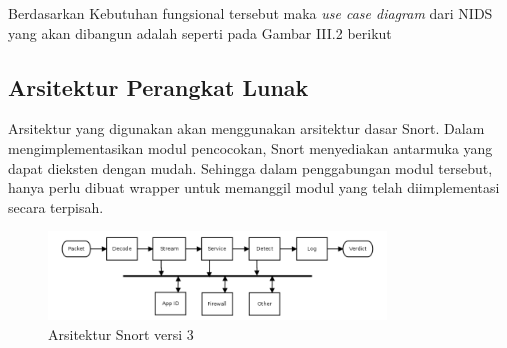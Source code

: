       Berdasarkan Kebutuhan fungsional tersebut maka \emph{use case diagram} dari NIDS yang akan dibangun adalah seperti pada Gambar III.2 berikut

    \subsection{Arsitektur Perangkat Lunak}

      Arsitektur yang digunakan akan menggunakan arsitektur dasar Snort. Dalam mengimplementasikan modul pencocokan, Snort menyediakan antarmuka yang dapat dieksten dengan mudah. Sehingga dalam penggabungan modul tersebut, hanya perlu dibuat wrapper untuk memanggil modul yang telah diimplementasi secara terpisah.

      \begin{figure}[htb]
        \centering
        \includegraphics[width=0.8\textwidth]{resources/snort3.png}
        \caption[Arsitektur Snort versi 3]{Arsitektur Snort versi 3}
      \end{figure}


